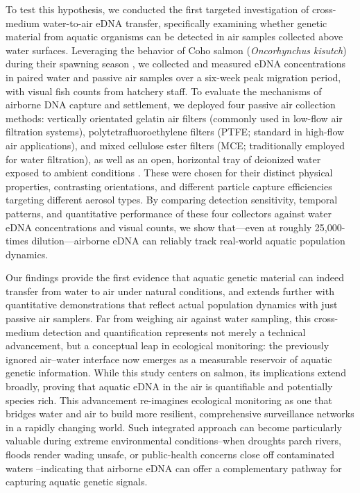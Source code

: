 \documentclass{article}
\begin{document}
To test this hypothesis, we conducted the first targeted investigation of cross-medium water-to-air eDNA transfer, specifically examining whether genetic material from aquatic organisms can be detected in air samples collected above water surfaces. Leveraging the behavior of Coho salmon (\textit{Oncorhynchus kisutch}) during their spawning season \cite{mueller2008}, we collected and measured eDNA concentrations in paired water and passive air samples over a six-week peak migration period, with visual fish counts from hatchery staff. To evaluate the mechanisms of airborne DNA capture and settlement, we deployed four passive air collection methods: vertically orientated gelatin air filters (commonly used in low-flow air filtration systems), polytetrafluoroethylene filters (PTFE; standard in high-flow air applications), and mixed cellulose ester filters (MCE; traditionally employed for water filtration), as well as an open, horizontal tray of deionized water exposed to ambient conditions \cite{klepke2022}. These were chosen for their distinct physical properties, contrasting orientations, and different particle capture efficiencies targeting different aerosol types. By comparing detection sensitivity, temporal patterns, and quantitative performance of these four collectors against water eDNA concentrations and visual counts, we show that—even at roughly 25,000-times dilution—airborne eDNA can reliably track real-world aquatic population dynamics.

Our findings provide the first evidence that aquatic genetic material can indeed transfer from water to air under natural conditions, and extends further with quantitative demonstrations that reflect actual population dynamics with just passive air samplers. Far from weighing air against water sampling, this cross-medium detection and quantification represents not merely a technical advancement, but a conceptual leap in ecological monitoring: the previously ignored air–water interface now emerges as a measurable reservoir of aquatic genetic information. While this study centers on salmon, its implications extend broadly, proving that aquatic eDNA in the air is quantifiable and potentially species rich. This advancement re-imagines ecological monitoring as one that bridges water and air to build more resilient, comprehensive surveillance networks in a rapidly changing world. Such integrated approach can become particularly valuable during extreme environmental conditions--when droughts parch rivers, floods render wading unsafe, or public-health concerns close off contaminated waters \cite{chen2024, ruiz-ramos2023, wan2023}--indicating that airborne eDNA can offer a complementary pathway for capturing aquatic genetic signals.
\end{document}
